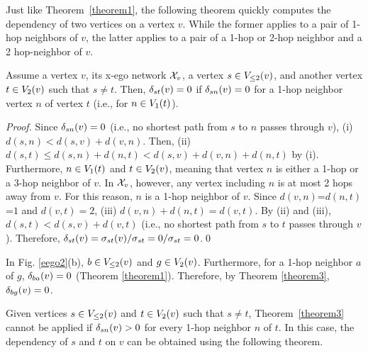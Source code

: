 Just like Theorem~\ref{theorem1}, the following theorem quickly computes the dependency of two vertices on a vertex $v$.
While the former applies to a pair of 1-hop neighbors of $v$, the latter applies to a pair of a 1-hop or 2-hop neighbor and a 2 hop-neighbor of $v$.
\begin{theorem}
\label{theorem3} 
Assume a vertex $v$, its x-ego network $\XN{v}$, a vertex $s \in \LV{v}{2}$, and another vertex $t \in \V{v}{2}$ such that $s \ne t$.
Then, $\D{s}{t}{v} = 0$ if $\D{s}{n}{v} = 0$ for a 1-hop neighbor vertex $n$ of vertex $t$ (i.e., for $n \in \V{t}{1}$).
\begin{proof}
Since $\D{s}{n}{v} = 0$ (i.e., no shortest path from $s$ to $n$ passes through $v$), (i) $d(s, n) < d(s, v) +d(v, n)$.
Then, (ii) $d(s, t) \le d(s, n) + d(n, t) < d(s, v) + d(v, n) + d(n, t)$ by (i).
Furthermore, $n \in \V{t}{1}$ and $t \in \V{v}{2}$, meaning that vertex $n$ is either a 1-hop or a 3-hop neighbor of $v$.
In $\XN{v}$, however, any vertex including $n$ is at most 2 hops away from $v$.
For this reason, $n$ is a 1-hop neighbor of $v$.
Since $d(v, n)$=$d(n, t)$=$1$ and $d(v, t)=2$, (iii) $d(v, n) + d(n, t) = d(v, t)$. 
By (ii) and (iii), $d(s, t) < d(s, v) +d(v, t)$ (i.e., no shortest path from $s$ to $t$ passes through $v$).
Therefore, $\D{s}{t}{v}  = \sigma_{st}(v)/\sigma_{st} = 0/\sigma_{st} = 0$.\hfill\qed
\end{proof}
\end{theorem}
\begin{example}
In Fig. \ref{eego2}(b), $b \in \LV{v}{2}$ and $g \in \V{v}{2}$. 
Furthermore, for a 1-hop neighbor $a$ of $g$, $\D{b}{a}{v}=0$ (Theorem \ref{theorem1}).
Therefore, by Theorem \ref{theorem3}, $\D{b}{g}{v}=0$.
\end{example}
Given vertices $s \in \LV{v}{2}$ and $t \in \V{v}{2}$ such that $s \ne t$, Theorem~\ref{theorem3} cannot be applied if $\D{s}{n}{v} > 0$ for every 1-hop neighbor $n$ of $t$.
In this case, the dependency of $s$ and $t$ on $v$ can be obtained using the following theorem.
